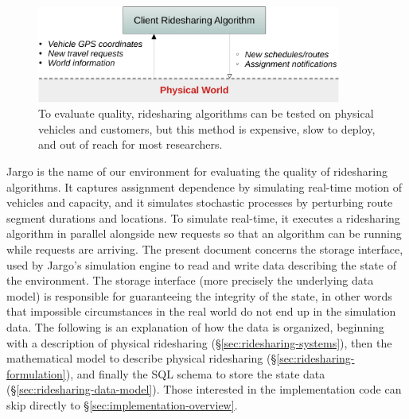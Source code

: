 \documentclass{article}
\theoremstyle{definition}                   %
\begin{document}
\begin{figure}[h]
\centering
\includegraphics[width=100mm]{src/fig/physical}
\caption{To evaluate quality, ridesharing algorithms can be tested on physical
vehicles and customers, but this method is expensive, slow to deploy, and out
of reach for most researchers.}
\label{fig:physical}
\end{figure}

Jargo is the name of our environment for evaluating the quality of ridesharing
algorithms. It captures assignment dependence by simulating real-time motion of
vehicles and capacity, and it simulates stochastic processes by perturbing
route segment durations and locations. To simulate real-time, it executes a
ridesharing algorithm in parallel alongside new requests so that an algorithm
can be running while requests are arriving. The present document concerns the
storage interface, used by Jargo's simulation engine to read and write data
describing the state of the environment. The storage interface (more precisely
the underlying data model) is responsible for guaranteeing the integrity of the
state, in other words that impossible circumstances in the real world do not
end up in the simulation data. The following is an explanation of how the data
is organized, beginning with a description of physical ridesharing
(\S\ref{sec:ridesharing-systems}), then the mathematical model to describe
physical ridesharing (\S\ref{sec:ridesharing-formulation}), and finally the SQL
schema to store the state data (\S\ref{sec:ridesharing-data-model}).  Those
interested in the implementation code can skip directly to
\S\ref{sec:implementation-overview}.
\end{document}
